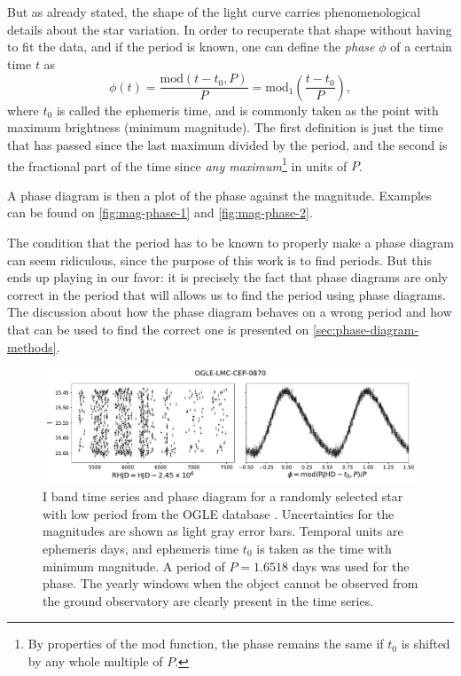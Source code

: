 	But as already stated, the shape of the light curve carries phenomenological details about the star variation.
	In order to recuperate that shape without having to fit the data, and if the period is known,
	one can define the \textit{phase} $\phi$ of a certain time $t$ as
	\begin{equation}
		\phi(t) = \frac{\text{mod}(t-t_0,P)}{P} = \text{mod}_1\left(\frac{t-t_0}{P}\right), \label{eq:phase}
	\end{equation}
	where $t_0$ is called the ephemeris time, and is commonly taken as the point with maximum brightness (minimum magnitude).
	The first definition is just the time that has passed since the last maximum divided by the period, 
	and the second is the fractional part of the time since \textit{any maximum}\footnote{
		By properties of the mod function, the phase remains the same if $t_0$ is shifted by any whole multiple of $P$.
	} in units of $P$.
	
	A phase diagram is then a plot of the phase against the magnitude. 
	Examples can be found on \autoref{fig:mag-phase-1} and \autoref{fig:mag-phase-2}.
	
	The condition that the period has to be known to properly make a phase diagram can seem ridiculous, 
	since the purpose of this work is to find periods.
	But this ends up playing in our favor: 
	it is precisely the fact that phase diagrams are only correct in the period that will allows us to find the period using phase diagrams.
	The discussion about how the phase diagram behaves on a wrong period and how that can be used to find the correct one is presented on \autoref{sec:phase-diagram-methods}.
	
	\begin{figure}
		\centering
		\includegraphics[width=\textwidth]{img/mag_phase_LMC_0870.pdf}
		\caption[Light curve of OGLE-LMC-CEP-0870]{
			I band time series and phase diagram for a randomly selected star with low period from the OGLE database \citep{OGLE2016}.
			Uncertainties for the magnitudes are shown as light gray error bars.
			Temporal units are ephemeris days, and ephemeris time $t_0$ is taken as the time with minimum magnitude.
			A period of $P=1.6518$ days was used for the phase.
			The yearly windows when the object cannot be observed from the ground observatory are clearly present in the time series.
		} 
		\label{fig:mag-phase-1}
	\end{figure}
	
